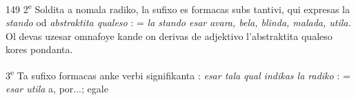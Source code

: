 \begin{VUpage}[153]{149}
2\textsuperscript{e} Soldita a nomala radiko, la sufixo es formacas subs\cc
tantivi, qui expresas la \textit{stando} od \textit{abstraktita qualeso} : \cc
{} = \textit{la stando esar}\nl
\textit{avara, bela, blinda, malada, utila.} Ol devas uzesar omnafoye\nl
kande on derivas de adjektivo l'abstraktita qualeso kores\cc
pondanta.

3\textsuperscript{e} Ta sufixo formacas anke verbi signifikanta : \textit{esar tala}\nl
\textit{qual indikas la radiko} :  = \textit{esar utila} a, por...; egale\cc
\end{VUpage}


